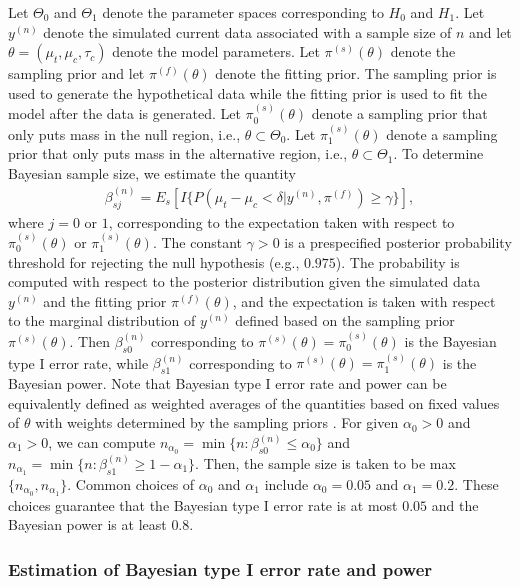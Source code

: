 Let $\Theta_0$ and $\Theta_1$ denote the parameter spaces corresponding to $H_0$ and $H_1$. Let $y^{(n)}$ denote the simulated current data associated with a sample size of $n$ and let $\theta=(\mu_t, \mu_c, \tau_c)$ denote the model parameters. Let $\pi^{(s)}(\theta)$ denote the sampling prior and let $\pi^{(f)}(\theta)$ denote the fitting prior. The sampling prior is used to generate the hypothetical data while the fitting prior is used to fit the model after the data is generated. Let $\pi_0^{(s)}(\theta)$ denote a sampling prior that only puts mass in the null region, i.e., $\theta \subset \Theta_0$. Let $\pi_1^{(s)}(\theta)$ denote a sampling prior that only puts mass in the alternative region, i.e., $\theta \subset \Theta_1$. To determine Bayesian sample size, we estimate the quantity
\begin{align}\label{defpower}
\beta_{sj}^{(n)}=E_s[I\{P(\mu_t-\mu_c<\delta|y^{(n)}, \pi^{(f)})\ge \gamma\}],
\end{align}
where $j=0$ or $1$, corresponding to the expectation taken with respect to $\pi_0^{(s)}(\theta)$ or $\pi_1^{(s)}(\theta)$. The constant $\gamma > 0$ is a prespecified posterior probability threshold for rejecting the null hypothesis (e.g., $0.975$). The probability is computed with respect to the posterior distribution given the simulated data $y^{(n)}$ and the fitting prior $\pi^{(f)}(\theta)$, and the expectation is taken with respect to the marginal distribution of $y^{(n)}$ defined based on the sampling prior $\pi^{(s)}(\theta)$. Then $\beta_{s0}^{(n)}$ corresponding to $\pi^{(s)}(\theta)=\pi_0^{(s)}(\theta)$ is the Bayesian type I error rate, while $\beta_{s1}^{(n)}$ corresponding to $\pi^{(s)}(\theta)=\pi_1^{(s)}(\theta)$ is the Bayesian power. Note that Bayesian type I error rate and power can be equivalently defined as weighted averages of the quantities based on fixed values of $\theta$ with weights determined by the sampling priors \citep{psioda_2018}. For given $\alpha_0 > 0$ and $\alpha_1 > 0$, we can compute $n_{\alpha_0} = \min\{n: \beta_{s0}^{(n)} \le \alpha_0\}$ and $n_{\alpha_1} = \min\{n: \beta_{s1}^{(n)} \ge 1-\alpha_1\}$. Then, the sample size is taken to be max$\{n_{\alpha_0}, n_{\alpha_1}\}$. Common choices of $\alpha_0$ and $\alpha_1$ include $\alpha_0=0.05$ and $\alpha_1=0.2$. These choices guarantee that the Bayesian type I error rate is at most $0.05$ and the Bayesian power is at least $0.8$.

\subsubsection*{Estimation of Bayesian type I error rate and power}

